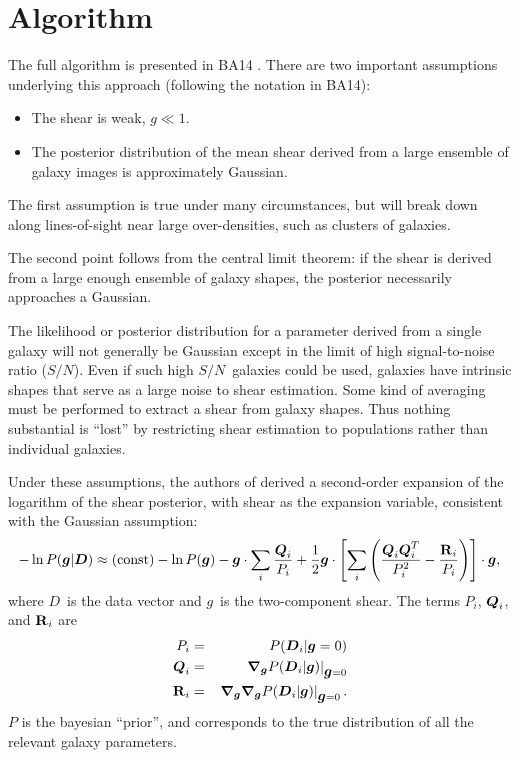 \documentclass[12pt,preprint]{aastex}
\newcommand{\sn}{$S/N$}
\newcommand{\vecg}{\mbox{\boldmath $g$}}
\newcommand{\vecD}{\mbox{\boldmath $D$}}
\newcommand{\vecQ}{\mbox{\boldmath $Q$}}
\newcommand{\matR}{\mbox{$\bf R$}}
\newcommand{\bnabg}{ \boldsymbol{\nabla_g}}
\begin{document}
\section{Algorithm} \label{sec:algo}

The full algorithm is presented in BA14 .  There are two
important assumptions underlying this approach (following the notation in
BA14):

\begin{itemize}

    \item The shear is weak, $g \ll 1$.

    \item The posterior distribution of the mean shear derived from a large
        ensemble of galaxy images is approximately Gaussian.

\end{itemize}

The first assumption is true under many circumstances, but will break down
along lines-of-sight near large over-densities, such as clusters of galaxies.

The second point follows from the central limit theorem: if the shear is
derived from a large enough ensemble of galaxy shapes, the posterior
necessarily approaches a Gaussian.

The likelihood or posterior distribution for a parameter derived from a single
galaxy will not generally be Gaussian except in the limit of high
signal-to-noise ratio (\sn). Even if such high \sn\ galaxies could be used,
galaxies have intrinsic shapes that serve as a large noise to shear estimation.
Some kind of averaging must be performed to extract a shear from galaxy shapes.
Thus nothing substantial is ``lost'' by restricting shear estimation to
populations rather than individual galaxies.  

Under these assumptions, the authors of \cite{ba14} derived a second-order
expansion of the logarithm of the shear posterior, with shear as the
expansion variable, consistent with the Gaussian assumption:
\begin{equation} \label{eq:pexpand}
-\ln P(\vecg | \vecD) \approx {(\rm const)} - \ln P(\vecg) - \vecg \cdot \sum_i
    \frac{\vecQ_i}{P_i}
    + \frac{1}{2} \vecg \cdot \left[ \sum_i \left(\frac{\vecQ_i \vecQ^T_i}{P_i^2}
    - \frac{\matR_i}{P_i}\right) \right] \cdot \vecg,
\end{equation}
where \vecD\ is the data vector and \vecg\ is the two-component shear.  The
terms $P_i$, $\vecQ_i$, and $\matR_i$ are 
\begin{eqnarray} \label{eq:pqrdef}
P_i     & = & P(\vecD_i | \vecg=0) \nonumber \\
\vecQ_i & = & \left. \bnabg P(\vecD_i | \vecg)\right|_{\vecg=0} \\
\matR_i & = & \left. \bnabg \bnabg P(\vecD_i | \vecg)\right|_{\vecg=0}. \nonumber
\end{eqnarray}
$P$ is the bayesian ``prior'', and corresponds to the true distribution
of all the relevant galaxy parameters.
\end{document}
